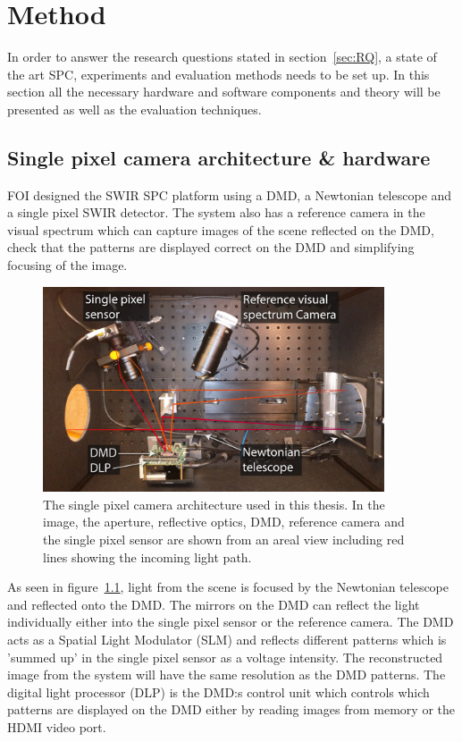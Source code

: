 \chapter{Method} \label{sec:method}
In order to answer the research questions stated in section~\ref{sec:RQ}, a state of the art SPC, experiments and evaluation methods needs to be set up. In this section all the necessary hardware and software components and theory will be presented as well as the evaluation techniques. 


\section{Single pixel camera architecture \& hardware}
\label{sec:system}
FOI designed the SWIR SPC platform using a DMD, a Newtonian telescope and a single pixel SWIR detector. The system also has a reference camera in the visual spectrum  which can capture images of the scene reflected on the DMD, check that the patterns are displayed correct on the DMD and simplifying focusing of the image.  

\begin{figure}[H]
    \centering
    \includegraphics[width = 0.9\textwidth]{gfx/SPC.png}
    \caption{The single pixel camera architecture used in this thesis. In the image, the aperture, reflective optics, DMD, reference camera and the single pixel sensor are shown from an areal view including red lines showing the incoming light path.}
    \label{fig:system1}
\end{figure}



As seen in figure~\ref{fig:system1}, light from the scene is focused by the Newtonian telescope and reflected onto the DMD. The mirrors on the DMD can reflect the light individually either into the single pixel sensor or the reference camera. The DMD acts as a Spatial Light Modulator (SLM) and reflects different patterns which is 'summed up' in the single pixel sensor as a voltage intensity. The reconstructed image from the system will have the same resolution as the DMD patterns. The digital light processor (DLP) is the DMD:s control unit which controls which patterns are displayed on the DMD either by reading images from memory or the HDMI video port. 

